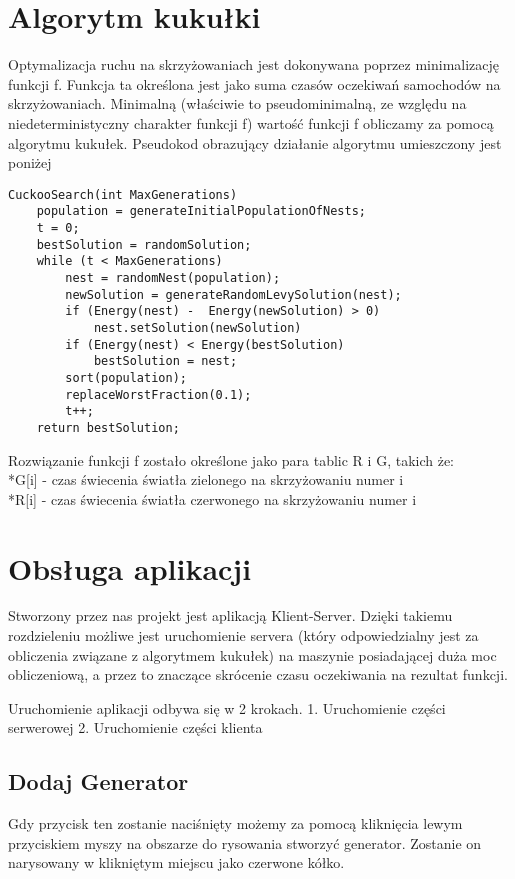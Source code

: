 \documentclass{article}
\begin{document}
\section{Algorytm kukułki}
    Optymalizacja ruchu na skrzyżowaniach jest dokonywana poprzez minimalizację funkcji f. Funkcja ta określona jest jako suma czasów oczekiwań samochodów na skrzyżowaniach. Minimalną (właściwie to pseudominimalną, ze względu na niedeterministyczny charakter funkcji f) wartość funkcji f 
obliczamy za pomocą algorytmu kukułek. Pseudokod obrazujący działanie algorytmu umieszczony jest poniżej

\begin{lstlisting}
CuckooSearch(int MaxGenerations)
    population = generateInitialPopulationOfNests;
    t = 0;
    bestSolution = randomSolution;
    while (t < MaxGenerations)
        nest = randomNest(population);
        newSolution = generateRandomLevySolution(nest);
        if (Energy(nest) -  Energy(newSolution) > 0)
            nest.setSolution(newSolution)
        if (Energy(nest) < Energy(bestSolution)
            bestSolution = nest;
        sort(population);
        replaceWorstFraction(0.1);
        t++;
    return bestSolution;
\end{lstlisting}

Rozwiązanie funkcji f zostało określone jako para tablic R i G, takich że: 
\\*G[i]  - czas świecenia światła zielonego na skrzyżowaniu numer i
\\*R[i]  - czas świecenia światła czerwonego na skrzyżowaniu numer i

\section{Obsługa aplikacji}
  Stworzony przez nas projekt jest aplikacją Klient-Server. Dzięki takiemu rozdzieleniu możliwe jest uruchomienie servera (który odpowiedzialny jest za obliczenia związane z algorytmem kukułek) na maszynie posiadającej duża moc obliczeniową, a przez to znaczące skrócenie czasu oczekiwania na rezultat funkcji. 

Uruchomienie aplikacji odbywa się w 2 krokach.
1. Uruchomienie części serwerowej
2. Uruchomienie części klienta

\subsection{Dodaj Generator}
    Gdy przycisk ten zostanie naciśnięty możemy za pomocą kliknięcia lewym przyciskiem myszy na obszarze do rysowania stworzyć generator. Zostanie on narysowany w klikniętym miejscu jako czerwone kółko.
\end{document}
